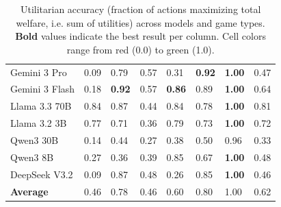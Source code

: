 \begin{table}[!t]
\begin{adjustbox}{max width=\textwidth}
\begin{tabular}{lGGGGGG|G}
Gemini 3 Pro & 0.09 & 0.79 & 0.57 & 0.31 & \textbf{0.92} & \textbf{1.00} & 0.47 \\
Gemini 3 Flash & 0.18 & \textbf{0.92} & 0.57 & \textbf{0.86} & 0.89 & \textbf{1.00} & 0.64 \\
Llama 3.3 70B & 0.84 & 0.87 & 0.44 & 0.84 & 0.78 & \textbf{1.00} & 0.81 \\
Llama 3.2 3B & 0.77 & 0.71 & 0.36 & 0.79 & 0.73 & \textbf{1.00} & 0.72 \\
Qwen3 30B & 0.14 & 0.44 & 0.27 & 0.38 & 0.50 & 0.96 & 0.33 \\
Qwen3 8B & 0.27 & 0.36 & 0.39 & 0.85 & 0.67 & \textbf{1.00} & 0.48 \\
DeepSeek V3.2 & 0.09 & 0.87 & 0.48 & 0.26 & 0.85 & \textbf{1.00} & 0.46 \\
\midrule
\textbf{Average} & 0.46 & 0.78 & 0.46 & 0.60 & 0.80 & 1.00 & 0.62 \\
\bottomrule
\end{tabular}
\end{adjustbox}
\caption{Utilitarian accuracy (fraction of actions maximizing total welfare, i.e. sum of utilities) across models and game types. \textbf{Bold} values indicate the best result per column. Cell colors range from \textcolor[HTML]{D73027}{red} (0.0) to \textcolor[HTML]{1A9850}{green} (1.0).}
\label{tab:accuracy_heatmap_transposed}
\vspace{-0.5cm}
\end{table}